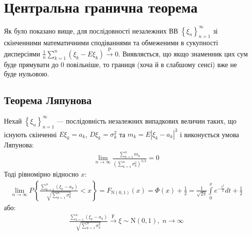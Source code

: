 \section{Центральна гранична теорема}
Як було показано вище, для послідовності незалежних ВВ 
$\left\{ \xi_n\right\}_{n=1}^\infty$ зі скінченними математичними сподіваннями та обмеженими в сукупності
дисперсіями $\frac{1}{n}\sum\limits_{k=1}^n (\xi_k - E\xi_k) \overset{\mathrm{P}}{\longrightarrow} 0$.
Виявляється, що якщо знаменник цих сум буде прямувати до $0$ повільніше, то границя (хоча й в слабшому сенсі) вже не буде нульовою.
\subsection{Теорема Ляпунова}
\begin{theorem*}
    Нехай $\left\{ \xi_n\right\}_{n=1}^\infty$ --- послідовність незалежних випадкових величин таких, 
    що існують скінченні $E\xi_k = a_k$, $D\xi_k = \sigma_k^2$ та
    $m_k = E\left|\xi_k - a_k\right|^3$ і виконується умова Ляпунова:
    \begin{gather*}
        \lim_{n \rightarrow \infty} \frac{\sum\limits_{k=1}^n m_k}{\left(
            \sum\limits_{k=1}^n \sigma_k^2
        \right)^{3/2}} = 0
    \end{gather*}
    Тоді рівномірно відносно $x$:
    \begin{gather}
        \lim_{n \rightarrow \infty} P \left\{
            \frac{\sum\limits_{k=1}^n (\xi_k - a_k)}
            {\sqrt{\sum\limits_{k=1}^n \sigma_k^2}}
            < x
        \right\} = F_{\mathrm{N}(0, 1)}(x) = \Phi(x) + \frac{1}{2} = 
        \frac{1}{\sqrt{2\pi}} \int\limits_0^x e^{-\frac{t^2}{2}} dt + \frac{1}{2}
    \end{gather}
    або:
    \begin{gather*}
        \frac{\sum\limits_{k=1}^n (\xi_k - a_k)}
        {\sqrt{\sum\limits_{k=1}^n \sigma_k^2}}
        \overset{\mathrm{F}}{\longrightarrow} \xi \sim \mathrm{N}(0, 1),  \; n\to \infty
    \end{gather*}
\end{theorem*}

